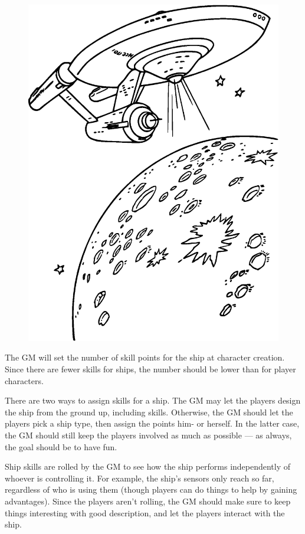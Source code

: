 \documentclass[12pt,titlepage,openany]{book}
\begin{document}
\begin{figure}
    \centering
    \includegraphics[width=0.8\linewidth]{img/StarshipPlanet.eps}\\
\end{figure}

The GM will set the number of skill points for the ship at character creation.
Since there are fewer skills for ships, the number should be lower than for
player characters.

There are two ways to assign skills for a ship. The GM may let the players
design the ship from the ground up, including skills. Otherwise, the GM should
let the players pick a ship type, then assign the points him- or herself. In
the latter case, the GM should still keep the players involved as much as
possible --- as always, the goal should be to have fun.

Ship skills are rolled by the GM to see how the ship performs independently of
whoever is controlling it. For example, the ship's sensors only reach so far,
regardless of who is using them (though players can do things to help by
gaining advantages). Since the players aren't rolling, the GM should make sure
to keep things interesting with good description, and let the players interact
with the ship.
\end{document}
